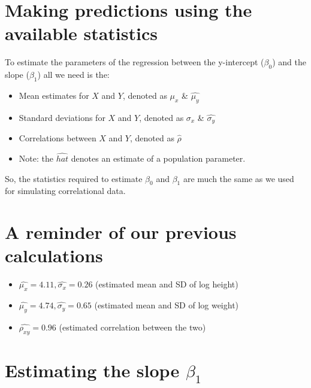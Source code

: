\documentclass[
]{article}
\providecommand{\tightlist}{%
  \setlength{\itemsep}{0pt}\setlength{\parskip}{0pt}}
\begin{document}
\hypertarget{making-predictions-using-the-available-statistics}{%
\section{Making predictions using the available
statistics}\label{making-predictions-using-the-available-statistics}}

To estimate the parameters of the regression between the y-intercept
(\(\beta_0\)) and the slope (\(\beta_1\)) all we need is the:

\begin{itemize}
\tightlist
\item
  Mean estimates for \(X\) and \(Y\), denoted as \(\hat{\mu_x}\) \&
  \(\hat{\mu_y}\)
\item
  Standard deviations for \(X\) and \(Y\), denoted as \(\hat{\sigma_x}\)
  \& \(\hat{\sigma_y}\)
\item
  Correlations between \(X\) and \(Y\), denoted as \(\hat{\rho}\)
\item
  Note: the \(\hat{hat}\) denotes an estimate of a population parameter.
\end{itemize}

So, the statistics required to estimate \(\beta_0\) and \(\beta_1\) are
much the same as we used for simulating correlational data.

\hypertarget{a-reminder-of-our-previous-calculations}{%
\section{A reminder of our previous
calculations}\label{a-reminder-of-our-previous-calculations}}

\begin{itemize}
\item
  \(\hat{\mu_x} = 4.11, \hat{\sigma_x} = 0.26\) (estimated mean and SD
  of log height)
\item
  \(\hat{\mu_y} = 4.74, \hat{\sigma_y} = 0.65\) (estimated mean and SD
  of log weight)
\item
  \(\hat{\rho_{xy}} = 0.96\) (estimated correlation between the two)
\end{itemize}

\hypertarget{estimating-the-slope-beta_1}{%
\section{\texorpdfstring{Estimating the slope
\(\beta_1\)}{Estimating the slope \textbackslash beta\_1}}\label{estimating-the-slope-beta_1}}
\end{document}
